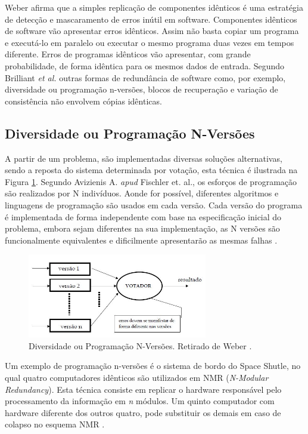 Weber \cite{Weber:2002} afirma que a simples replicação de componentes idênticos é uma estratégia de detecção e mascaramento de erros inútil em software. Componentes idênticos de software vão apresentar erros idênticos. Assim não basta copiar um programa e executá-lo em paralelo ou executar o mesmo programa duas vezes em tempos diferente. Erros de programas idênticos vão apresentar, com grande probabilidade, de forma idêntica para os mesmos dados de entrada. Segundo Brilliant \textit{et al.} outras formas de redundância de software como, por exemplo, diversidade ou programação n-versões, blocos de recuperação e variação de consistência não envolvem cópias idênticas.

\subsection{Diversidade ou Programação N-Versões}

A partir de um problema, são implementadas diversas soluções alternativas, sendo a reposta do sistema determinada por votação, esta técnica é ilustrada na Figura \ref{Img:nVersion}. Segundo Avizienis \cite{Avizienis:1995} A. \textit{apud} Fischler et. al., os esforços de programação são realizados por N indivíduos. Aonde for possível, diferentes algoritmos e linguagens de programação são usados em cada versão. Cada versão do programa é implementada de forma independente com base na especificação inicial do problema, embora sejam diferentes na sua implementação, as N versões são funcionalmente equivalentes e dificilmente apresentarão as mesmas falhas \cite{Avizienis:1995}. 

\begin{figure}[H]
	\centering
	\includegraphics[width=0.7\textwidth]{figuras/nVersions.jpg}
	\caption[Programação N-Versões]{Diversidade ou Programação N-Versões. Retirado de Weber \cite{Weber:2002}.}
	\label{Img:nVersion}	
\end{figure}  

Um exemplo de programação n-versões é o sistema de bordo do Space Shutle, no qual quatro computadores idênticos são utilizados em NMR (\textit{N-Modular Redundancy}). Esta técnica consiste em replicar o hardware responsável pelo processamento da informação em \textit{n} módulos. Um quinto computador com hardware diferente dos outros quatro, pode substituir os demais em caso de colapso no esquema NMR \cite{Pradhan:1996}.

